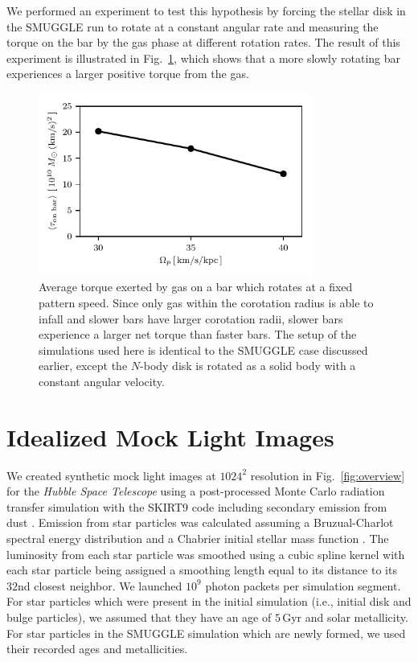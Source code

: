 \documentclass[fleqn,usenatbib]{mnras}
\newcommand{\Nbody}{$N$-body}
\begin{document}
We performed an experiment to test this hypothesis by forcing the stellar disk
in the SMUGGLE run to rotate at a constant angular rate and measuring the
torque on the bar by the gas phase at different rotation rates. The result of
this experiment is illustrated in Fig.~\ref{fig:equil}, which shows that a more
slowly rotating bar experiences a larger positive torque from the gas.

\begin{figure}[h!]
    \centering
    \includegraphics[width=9cm]{fig/torque_ps.pdf}
    \caption{Average torque exerted by gas on a bar which rotates at a fixed
    pattern speed. Since only gas within the corotation radius is able to infall
    and slower bars have larger corotation radii, slower bars experience a
    larger net torque than faster bars. The setup of the simulations used here
    is identical to the SMUGGLE case discussed earlier, except the \Nbody{} disk
    is rotated as a solid body with a constant angular
    velocity.}
    \label{fig:equil}
\end{figure}

\section{Idealized Mock Light Images}
\label{app:hst}
We created synthetic mock light images at $1024^2$ resolution in
Fig.~\ref{fig:overview} for the \textit{Hubble Space Telescope} using a
post-processed Monte Carlo radiation transfer simulation with the SKIRT9 code
including secondary emission from dust \citep{2020AC....3100381C}. Emission from
star particles was calculated assuming a Bruzual-Charlot spectral energy
distribution \citep{2003MNRAS.344.1000B} and a Chabrier initial stellar mass
function \citep{2003PASP..115..763C}. The luminosity from each star particle was
smoothed using a cubic spline kernel with each star particle being assigned a
smoothing length equal to its distance to its $32$nd closest neighbor. We
launched $10^9$ photon packets per simulation segment. For star particles
which were present in the initial simulation (i.e., initial disk and bulge
particles), we assumed that they have an age of $5\,\textrm{Gyr}$ and solar
metallicity. For star particles in the SMUGGLE simulation which are newly
formed, we used their recorded ages and metallicities.
\end{document}
